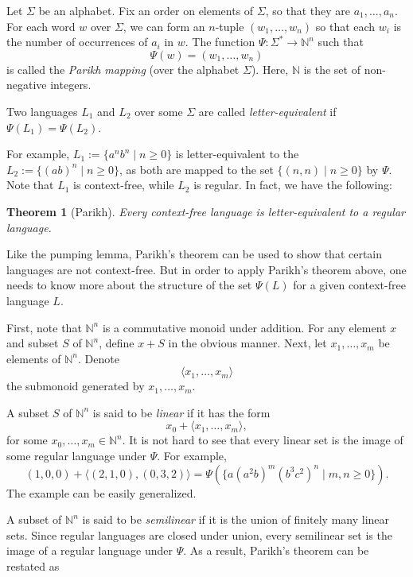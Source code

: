 \documentclass[12pt]{article}
\newtheorem{thm}{Theorem}
\begin{document}
Let $\Sigma$ be an alphabet.  Fix an order on elements of $\Sigma$, so that they are $a_1,\ldots, a_n$.  For each word $w$ over $\Sigma$, we can form an $n$-tuple $(w_1,\ldots, w_n)$ so that each $w_i$ is the number of occurrences of $a_i$ in $w$.  The function $\Psi: \Sigma^* \to \mathbb{N}^n$ such that $$\Psi(w)=(w_1,\ldots, w_n)$$ is called the \emph{Parikh mapping} (over the alphabet $\Sigma$).  Here, $\mathbb{N}$ is the set of non-negative integers.

Two languages $L_1$ and $L_2$ over some $\Sigma$ are called \emph{letter-equivalent} if $\Psi(L_1)=\Psi(L_2)$.

For example, $L_1:=\lbrace a^nb^n \mid n\ge 0\rbrace$ is letter-equivalent to the $L_2:=\lbrace (ab)^n \mid n\ge 0 \rbrace$, as both are mapped to the set $\lbrace (n,n)\mid n\ge 0\rbrace$ by $\Psi$.  Note that $L_1$ is context-free, while $L_2$ is regular.  In fact, we have the following:

\begin{thm}[Parikh] Every context-free language is letter-equivalent to a regular language. \end{thm}

Like the pumping lemma, Parikh's theorem can be used to show that certain languages are not context-free.  But in order to apply Parikh's theorem above, one needs to know more about the structure of the set $\Psi(L)$ for a given context-free language $L$.

First, note that $\mathbb{N}^n$ is a commutative monoid under addition.  For any element $x$ and subset $S$ of $\mathbb{N}^n$, define $x+S$ in the obvious manner.  Next, let $x_1,\ldots, x_m$ be elements of $\mathbb{N}^n$.  Denote $$\langle x_1,\ldots, x_m \rangle$$ the submonoid generated by $x_1,\ldots, x_m$.  

A subset $S$ of $\mathbb{N}^n$ is said to be \emph{linear} if it has the form $$x_0 + \langle x_1,\ldots, x_m\rangle,$$ for some $x_0,\ldots, x_m \in \mathbb{N}^n$.  It is not hard to see that every linear set is the image of some regular language under $\Psi$.  For example, $$(1,0,0)+\langle (2,1,0),(0,3,2)\rangle = \Psi(\lbrace a(a^2b)^m (b^3c^2)^n \mid m,n\ge 0\rbrace).$$  The example can be easily generalized.

A subset of $\mathbb{N}^n$ is said to be \emph{semilinear} if it is the union of finitely many linear sets.  Since regular languages are closed under union, every semilinear set is the image of a regular language under $\Psi$.  As a result, Parikh's theorem can be restated as 
\end{document}
